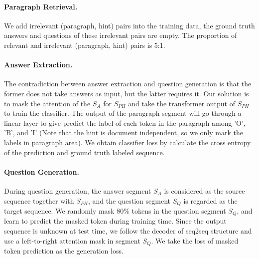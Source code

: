 \paragraph{Paragraph Retrieval.} We add irrelevant (paragraph, hint) pairs into the training data, the ground truth answers and questions of these irrelevant pairs are empty. The proportion of relevant and irrelevant (paragraph, hint) pairs is 5:1.

\paragraph{Answer Extraction.} The contradiction between answer extraction and question generation is that the former does not take answers as input, but the latter requires it. Our solution is to mask the attention of the $S_{A}$ for $S_{PH}$ and take the transformer output of $S_{PH}$ to train the classifier. The output of the paragraph segment will go through a linear layer to give predict the label of each token in the paragraph among 'O', 'B', and 'I' (Note that the hint is document independent, so we only mark the labels in paragraph area). We obtain classifier loss by calculate the cross entropy of the prediction and ground truth labeled sequence.


\paragraph{Question Generation.} During question generation, the answer segment $S_A$ is considered as the source sequence together with $S_{PH}$, and the question segment $S_Q$ is regarded as the target sequence. We randomly mask 80\% tokens in the question segment $S_Q$, and learn to predict the masked token during training time. Since the output sequence is unknown at test time, we follow the decoder of seq2seq structure and use a left-to-right attention mask in segment $S_Q$. We take the loss of masked token prediction as the generation loss. 


